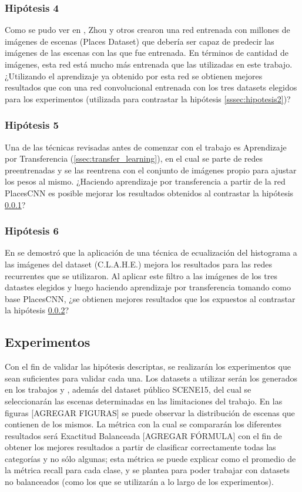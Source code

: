 \subsubsection{Hipótesis 4} \label{sssec:hipotesis4}
Como se pudo ver en \cite{learning_deep_features}, Zhou y otros crearon una red entrenada con millones de imágenes de escenas (Places Dataset) que debería ser capaz de predecir las imágenes de las escenas con las que fue entrenada. En términos de cantidad de imágenes, esta red está mucho más entrenada que las utilizadas en este trabajo. ¿Utilizando el aprendizaje ya obtenido por esta red se obtienen mejores resultados que con una red convolucional entrenada con los tres datasets elegidos para los experimentos (utilizada para contrastar la hipótesis \ref{sssec:hipotesis2})?

\subsubsection{Hipótesis 5} \label{sssec:hipotesis5}
Una de las técnicas revisadas antes de comenzar con el trabajo es Aprendizaje por Transferencia (\ref{ssec:transfer_learning}), en el cual se parte de redes preentrenadas y se las reentrena con el conjunto de imágenes propio para ajustar los pesos al mismo. ¿Haciendo aprendizaje por transferencia a partir de la red PlacesCNN es posible mejorar los resultados obtenidos al contrastar la hipótesis \ref{sssec:hipotesis4}?

\subsubsection{Hipótesis 6} \label{sssec:hipotesis6}
En \cite{lstm_real_estate} se demostró que la aplicación de una técnica de ecualización del histograma a las imágenes del dataset (C.L.A.H.E.) mejora los resultados para las redes recurrentes que se utilizaron. Al aplicar este filtro a las imágenes de los tres datastes elegidos y luego haciendo aprendizaje por transferencia tomando como base PlacesCNN, ¿se obtienen mejores resultados que los expuestos al contrastar la hipótesis \ref{sssec:hipotesis5}?


\subsection{Experimentos}
Con el fin de validar las hipótesis descriptas, se realizarán los experimentos que sean suficientes para validar cada una. Los datasets a utilizar serán los generados en los trabajos \cite{vision_based_real_estate_price_estimation} y \cite{lstm_real_estate}, además del dataset público SCENE15, del cual se seleccionarán las escenas determinadas en las limitaciones del trabajo. En las figuras [AGREGAR FIGURAS] se puede observar la distribución de escenas que contienen de los mismos. La métrica con la cual se compararán los diferentes resultados será Exactitud Balanceada [AGREGAR FÓRMULA] con el fin de obtener los mejores resultados a partir de clasificar correctamente todas las categorías y no sólo algunas; esta métrica se puede explicar como el promedio de la métrica recall para cada clase, y se plantea para poder trabajar con datasets no balanceados (como los que se utilizarán a lo largo de los experimentos).


